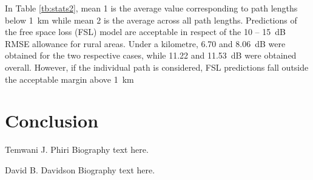 \documentclass[10pt,journal,twoside]{IEEEtran}
\begin{document}
In Table \ref{tb:stats2}, mean 1 is the average value corresponding to path lengths below \SI{1}{km} while mean 2 is the average across all path lengths. Predictions of the free space loss (FSL) model are  acceptable in respect of the \SI{10}{} -- \SI{15}{dB} RMSE allowance for rural areas. Under a kilometre, \SI{6.70}{} and \SI{8.06}{dB} were obtained for the two respective cases, while \SI{11.22}{} and \SI{11.53}{dB} were obtained overall. However, if the individual path is considered, FSL predictions fall outside the acceptable margin above \SI{1}{km}

\section{Conclusion}\label{Conclusion}




\begin{IEEEbiography}{Temwani J. Phiri}
Biography text here.
\end{IEEEbiography}



\begin{IEEEbiography}{David B. Davidson}
Biography text here.
\end{IEEEbiography}
\end{document}
